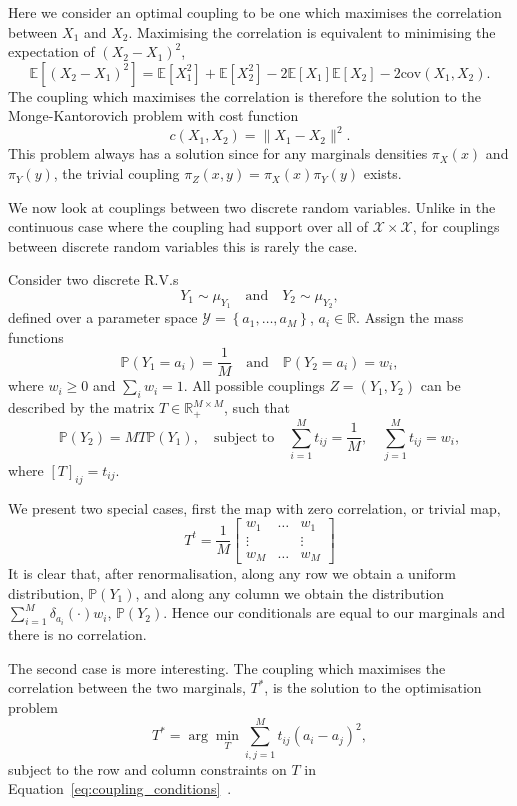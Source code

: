 \documentclass[final]{siamltex}
\begin{document}
Here we consider an optimal coupling to be one which maximises the correlation between $X_1$ and
$X_2$. Maximising the correlation is equivalent to minimising the expectation of $(X_2-X_1)^2$,
\[
	\mathbb{E}[(X_2-X_1)^2] = \mathbb{E}[X_1^2]+\mathbb{E}[X_2^2] - 2\mathbb{E}[X_1]\mathbb{E}[X_2]-
		2\text{cov}(X_1, X_2).
\]
The coupling which maximises the correlation is therefore the solution to the Monge-Kantorovich
problem with cost function
\[
	c(X_1,X_2) = \|X_1-X_2\|^2.
\]
This problem always has a solution since for any marginals densities $\pi_X(x)$ and $\pi_Y(y)$, the
trivial coupling $\pi_Z(x,y) = \pi_X(x)\pi_Y(y)$ exists.

We now look at couplings between two discrete random variables. Unlike in the continuous case where
the coupling had support over all of $\mathcal{X}\times\mathcal{X}$, for couplings between discrete
random variables this is rarely the case.

Consider two discrete R.V.s
\[
	Y_1 \sim \mu_{Y_1} \quad \text{and} \quad Y_2 \sim \mu_{Y_2},
\]
defined over a parameter space $\mathcal{Y} = \left\{a_1, \dots, a_M\right\}$, $a_i \in \mathbb{R}$.
Assign the mass functions
\[
	\mathbb{P}(Y_1 = a_i) = \frac{1}{M} \quad \text{and} \quad \mathbb{P}(Y_2 = a_i) = w_i,
\]
where $w_i \geq 0$ and $\sum_i \! w_i = 1$. All possible couplings $Z = (Y_1, Y_2)$ can be described
by the matrix $T \in \mathbb{R}^{M\times M}_+$, such that
\begin{equation}\label{eq:coupling_conditions}
\mathbb{P}(Y_2) = MT\mathbb{P}(Y_1), \quad \text{subject to} \quad \sum\limits_{i=1}^M \! t_{ij} =
\frac{1}{M}, \quad \sum\limits_{j=1}^M \! t_{ij} = w_i,
\end{equation}
where $[T]_{ij} = t_{ij}$.

We present two special cases, first the map with zero correlation, or trivial map,
\[
T^t = \frac{1}{M}\begin{bmatrix} w_1 & \dots & w_1 \\ \vdots & & \vdots \\ w_M & \dots & w_M
\end{bmatrix}
\]
It is clear that, after renormalisation, along any row we obtain a uniform distribution,
$\mathbb{P}(Y_1)$, and along any column we obtain the distribution $\sum_{i=1}^M
\delta_{a_i}(\cdot)w_i$, $\mathbb{P}(Y_2)$. Hence our conditionals are equal to our marginals and
there is no correlation.

The second case is more interesting. The coupling which maximises the correlation between the two
marginals, $T^*$, is the solution to the optimisation problem
\[
	T^*  = \arg\min_T \! \sum\limits_{i,j=1}^M \! t_{ij}(a_i - a_j)^2,
\]
subject to the row and column constraints on $T$ in Equation~\eqref{eq:coupling_conditions}~\cite{reich2015probabilistic}.
\end{document}

